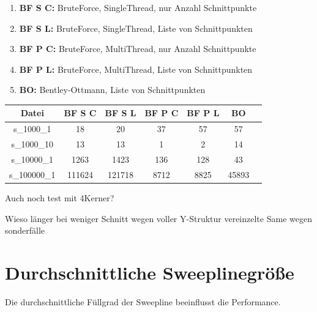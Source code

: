 \documentclass[conference]{IEEEtran}
\begin{document}
	\begin{enumerate}
		\item \textbf{BF S C:} BruteForce, SingleThread, nur Anzahl Schnittpunkte
		\item \textbf{BF S L:} BruteForce, SingleThread, Liste von Schnittpunkten
		\item \textbf{BF P C:} BruteForce, MultiThread, nur Anzahl Schnittpunkte
		\item \textbf{BF P L:} BruteForce, MultiThread, Liste von Schnittpunkten
		\item \textbf{BO:} Bentley-Ottmann, Liste von Schnittpunkten
	\end{enumerate}

	\begin{table}
		\small
		\begin{tabular}{|c|c|c|c|c|c|c|}
			\hline
			Datei & BF S C & BF S L & BF P C & BF P L & BO \\
			\hline
			s\_1000\_1 & 18 & 20 & 37 & 57 & 57\\
			\hline
			s\_1000\_10 & 13 & 13 & 1 & 2 & 14\\
			\hline
			s\_10000\_1 & 1263 & 1423 & 136 & 128 & 43\\
			\hline
			s\_100000\_1 & 111624 & 121718 & 8712 & 8825 & 45893\\%
			\hline
		\end{tabular}
	\end{table}

	Auch noch test mit 4Kerner?

	Wieso länger bei weniger Schnitt wegen voller Y-Struktur vereinzelte Same wegen sonderfälle
	
	\section{Durchschnittliche Sweeplinegröße}
	Die durchschnittliche Füllgrad der Sweepline beeinflusst die Performance.
\end{document}
